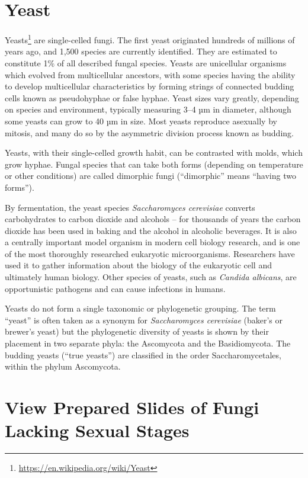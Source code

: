 \documentclass[]{book}
\let\rmarkdownfootnote\footnote%
\def\footnote{\protect\rmarkdownfootnote}
\renewcommand{\href}[2]{#2\footnote{\url{#1}}}
\begin{document}
\hypertarget{yeast}{%
\section{Yeast}\label{yeast}}

\href{https://en.wikipedia.org/wiki/Yeast}{Yeasts} are single-celled fungi. The first yeast originated hundreds of millions of years ago, and 1,500 species are currently identified. They are estimated to constitute 1\% of all described fungal species. Yeasts are unicellular organisms which evolved from multicellular ancestors, with some species having the ability to develop multicellular characteristics by forming strings of connected budding cells known as pseudohyphae or false hyphae. Yeast sizes vary greatly, depending on species and environment, typically measuring 3--4 µm in diameter, although some yeasts can grow to 40 µm in size. Most yeasts reproduce asexually by mitosis, and many do so by the asymmetric division process known as budding.

Yeasts, with their single-celled growth habit, can be contrasted with molds, which grow hyphae. Fungal species that can take both forms (depending on temperature or other conditions) are called dimorphic fungi (``dimorphic'' means ``having two forms'').

By fermentation, the yeast species \emph{Saccharomyces cerevisiae} converts carbohydrates to carbon dioxide and alcohols -- for thousands of years the carbon dioxide has been used in baking and the alcohol in alcoholic beverages. It is also a centrally important model organism in modern cell biology research, and is one of the most thoroughly researched eukaryotic microorganisms. Researchers have used it to gather information about the biology of the eukaryotic cell and ultimately human biology. Other species of yeasts, such as \emph{Candida albicans}, are opportunistic pathogens and can cause infections in humans.

Yeasts do not form a single taxonomic or phylogenetic grouping. The term ``yeast'' is often taken as a synonym for \emph{Saccharomyces cerevisiae} (baker's or brewer's yeast) but the phylogenetic diversity of yeasts is shown by their placement in two separate phyla: the Ascomycota and the Basidiomycota. The budding yeasts (``true yeasts'') are classified in the order Saccharomycetales, within the phylum Ascomycota.

\hypertarget{view-prepared-slides-of-fungi-lacking-sexual-stages}{%
\section{View Prepared Slides of Fungi Lacking Sexual Stages}\label{view-prepared-slides-of-fungi-lacking-sexual-stages}}
\end{document}

